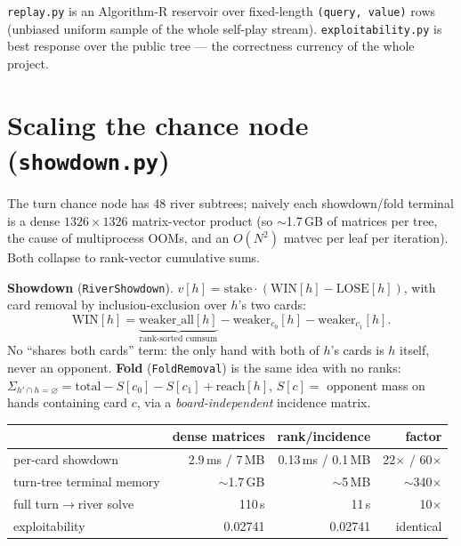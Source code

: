 \documentclass[11pt,a4paper]{article}
\newcommand{\file}[1]{\textcolor{accent}{\texttt{#1}}}
\newcommand{\fn}[1]{\texttt{#1}}
\begin{document}
\file{replay.py} is an Algorithm-R reservoir over fixed-length
\texttt{(query, value)} rows (unbiased uniform sample of the whole self-play
stream). \file{exploitability.py} is best response over the public tree --- the
correctness currency of the whole project.

\section{Scaling the chance node (\file{showdown.py})}\label{sec:scale}

The turn chance node has 48 river subtrees; naively each showdown/fold terminal
is a dense $1326\times1326$ matrix-vector product (so $\sim$1.7\,GB of matrices
per tree, the cause of multiprocess OOMs, and an $O(N^2)$ matvec per leaf per
iteration). Both collapse to rank-vector cumulative sums.

\begin{defbox}
\textbf{Showdown} (\fn{RiverShowdown}). $v[h]=\text{stake}\cdot(\text{WIN}[h]-\text{LOSE}[h])$,
with card removal by inclusion-exclusion over $h$'s two cards:
\[ \text{WIN}[h]=\underbrace{\text{weaker\_all}[h]}_{\text{rank-sorted cumsum}}-\text{weaker}_{c_0}[h]-\text{weaker}_{c_1}[h]. \]
No ``shares both cards'' term: the only hand with both of $h$'s cards is $h$
itself, never an opponent. \textbf{Fold} (\fn{FoldRemoval}) is the same idea with
no ranks: $\Sigma_{h'\cap h=\varnothing}=\text{total}-S[c_0]-S[c_1]+\text{reach}[h]$,
$S[c]=$ opponent mass on hands containing card $c$, via a \emph{board-independent}
incidence matrix.
\end{defbox}

\begin{center}\small
\begin{tabular}{@{}lrrr@{}}
\toprule
& dense matrices & rank/incidence & factor \\
\midrule
per-card showdown          & 2.9\,ms / 7\,MB & 0.13\,ms / 0.1\,MB & 22$\times$ / 60$\times$ \\
turn-tree terminal memory  & $\sim$1.7\,GB    & $\sim$5\,MB         & $\sim$340$\times$ \\
full turn$\to$river solve  & 110\,s           & 11\,s              & 10$\times$ \\
exploitability             & 0.02741          & 0.02741            & identical \\
\bottomrule
\end{tabular}
\end{center}
\end{document}

